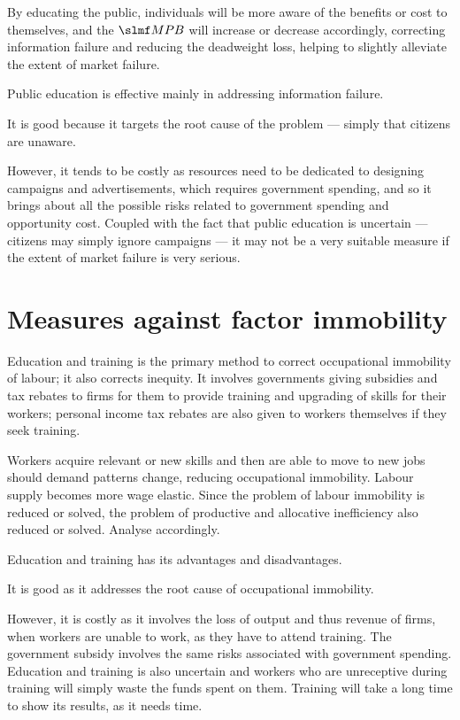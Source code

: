 \documentclass[Economics.tex]{subfiles}
\begin{document}
By educating the public, individuals will be more aware of the benefits or cost to themselves, and the \(\mrg{PB}\) will increase or decrease accordingly, correcting information failure and reducing the deadweight loss, helping to slightly alleviate the extent of market failure.

Public education is effective mainly in addressing information failure.

It is good because it targets the root cause of the problem --- simply that citizens are unaware.

However, it tends to be costly as resources need to be dedicated to designing campaigns and advertisements, which requires government spending, and so it brings about all the possible risks related to government spending and opportunity cost. Coupled with the fact that public education is uncertain --- citizens may simply ignore campaigns --- it may not be a very suitable measure if the extent of market failure is very serious.
\section{Measures against factor immobility}
Education and training is the primary method to correct occupational immobility of labour; it also corrects inequity. It involves governments giving subsidies and tax rebates to firms for them to provide training and upgrading of skills for their workers; personal income tax rebates are also given to workers themselves if they seek training.

Workers acquire relevant or new skills and then are able to move to new jobs should demand patterns change, reducing occupational immobility. Labour supply becomes more wage elastic. Since the problem of labour immobility is reduced or solved, the problem of productive and allocative inefficiency also reduced or solved. Analyse accordingly.

Education and training has its advantages and disadvantages.

It is good as it addresses the root cause of occupational immobility.

However, it is costly as it involves the loss of output and thus revenue of firms, when workers are unable to work, as they have to attend training. The government subsidy involves the same risks associated with government spending. Education and training is also uncertain and workers who are unreceptive during training will simply waste the funds spent on them. Training will take a long time to show its results, as it needs time.
\end{document}
